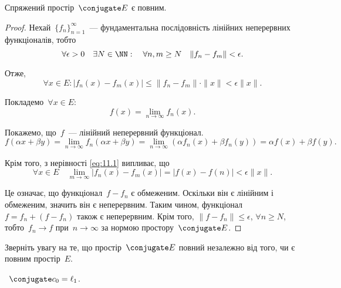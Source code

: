 \begin{theorem}
    Спряжений простір~$\conjugate E$ є повним.
\end{theorem}

\begin{proof}
    Нехай~$\{f_n\}_{n = 1}^\infty$~--- фундаментальна послідовність лінійних неперервних функціоналів, тобто
    \begin{equation*}
        \forall \epsilon > 0 \quad \exists N \in \NN: \quad \forall n, m \ge N \quad \|f_n - f_m\| < \epsilon.
    \end{equation*}

    Отже,
    \begin{equation}
        \label{eq:11.1}
        \forall x \in E: |f_n(x) - f_m(x)| \le \|f_n - f_m\| \cdot \|x\| < \epsilon \|x\|.
    \end{equation}
    
    Покладемо~$\forall x \in E$:
    \begin{equation*}
        f(x) = \lim_{n \to \infty} f_n(x).
    \end{equation*}
    
    Покажемо, що~$f$~--- лінійний неперервний функціонал.
    \begin{equation*}
        f(\alpha x + \beta y) =
        \lim_{n \to \infty} f_n(\alpha x + \beta y) =
        \lim_{n \to \infty} ( \alpha f_n(x) + \beta f_n(y)) =
        \alpha f(x) + \beta f(y).
    \end{equation*}
    
    Крім того, з нерівності \eqref{eq:11.1} випливає, що
    \begin{equation*}
        \forall x \in E \quad \lim_{m \to \infty} |f_n(x) - f_m(x)| = |f(x) - f(n)| < \epsilon \|x\|.
    \end{equation*}

    Це означає, що функціонал~$f - f_n$ є обмеженим. Оскільки він є лінійним і обмеженим, значить він є неперервним. Таким чином, функціонал~$f = f_n + (f - f_n)$ також є неперервним. Крім того, $\|f - f_n\| \le \epsilon$, $\forall n \ge N$, тобто~$f_n \to f$ при~$n \to \infty$ за нормою простору~$\conjugate E$. 
\end{proof}

\begin{remark}
    Зверніть увагу на те, що простір~$\conjugate E$ повний незалежно від того, чи є повним простір~$E$.
\end{remark}

\begin{example}
   ~$\conjugate c_0 = \ell_1$.
\end{example}

